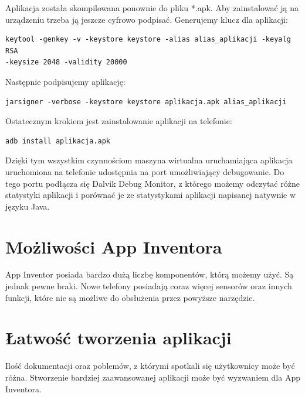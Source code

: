 Aplikacja została skompilowana ponownie do pliku *.apk. Aby zainstalować ją na urządzeniu trzeba ją jeszcze cyfrowo podpisać. Generujemy klucz dla aplikacji:

\begin{lstlisting}
keytool -genkey -v -keystore keystore -alias alias_aplikacji -keyalg RSA 
-keysize 2048 -validity 20000
\end{lstlisting}

Następnie podpisujemy aplikację:

\begin{lstlisting}
jarsigner -verbose -keystore keystore aplikacja.apk alias_aplikacji
\end{lstlisting}

Ostatecznym krokiem jest zainstalowanie aplikacji na telefonie:

\begin{lstlisting}
adb install aplikacja.apk
\end{lstlisting}

Dzięki tym wszystkim czynnościom maszyna wirtualna uruchamiająca aplikacja uruchomiona na telefonie udostępnia na port umożliwiający debugowanie. Do tego portu podłącza się Dalvik Debug Monitor, z którego możemy odczytać różne statystyki aplikacji i porównać je ze statystykami aplikacji napisanej natywnie w języku Java.

\section{Możliwości App Inventora}

App Inventor posiada bardzo dużą liczbę komponentów, którą możemy użyć. Są jednak pewne braki. Nowe telefony posiadają coraz więcej sensorów oraz innych funkcji, które nie są możliwe do obsłużenia przez powyższe narzędzie.

\section{Łatwość tworzenia aplikacji}

Ilość dokumentacji oraz poblemów, z którymi spotkali się użytkownicy może być różna. Stworzenie bardziej zaawansowanej aplikacji może być wyzwaniem dla App Inventora.

